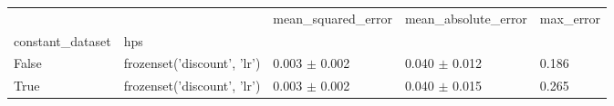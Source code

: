 \begin{tabular}{lllll}
\toprule
 &  & mean_squared_error & mean_absolute_error & max_error \\
constant_dataset & hps &  &  &  \\
\midrule
False & frozenset({'discount', 'lr'}) & 0.003 $\pm$ 0.002 & 0.040 $\pm$ 0.012 & 0.186 \\
\cline{1-5}
True & frozenset({'discount', 'lr'}) & 0.003 $\pm$ 0.002 & 0.040 $\pm$ 0.015 & 0.265 \\
\cline{1-5}
\bottomrule
\end{tabular}
